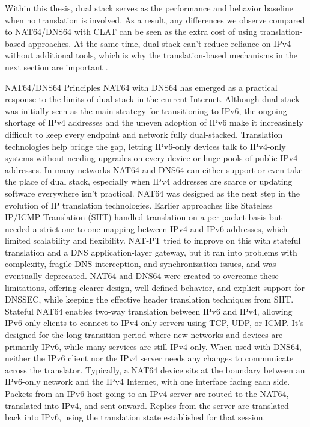 Within this thesis, dual stack serves as the performance and behavior baseline when no translation is involved. As a result, any differences we observe compared to NAT64/DNS64 with CLAT can be seen as the extra cost of using translation-based approaches. At the same time, dual stack can’t reduce reliance on IPv4 without additional tools, which is why the translation-based mechanisms in the next section are important \cite{punithavathani2009ipv4,LEVIN20141059}.

NAT64/DNS64 Principles
NAT64 with DNS64 has emerged as a practical response to the limits of dual stack in the current Internet\cite{rfc7269}. Although dual stack was initially seen as the main strategy for transitioning to IPv6, the ongoing shortage of IPv4 addresses and the uneven adoption of IPv6 make it increasingly difficult to keep every endpoint and network fully dual-stacked\cite{rfc7269}. Translation technologies help bridge the gap, letting IPv6-only devices talk to IPv4-only systems without needing upgrades on every device or huge pools of public IPv4 addresses. In many networks NAT64 and DNS64 can either support or even take the place of dual stack, especially when IPv4 addresses are scarce or updating software everywhere isn’t practical\cite{6231295}.
NAT64 was designed as the next step in the evolution of IP translation technologies. Earlier approaches like Stateless IP/ICMP Translation (SIIT) handled translation on a per-packet basis but needed a strict one-to-one mapping between IPv4 and IPv6 addresses, which limited scalability and flexibility\cite{rfc6146}. NAT-PT tried to improve on this with stateful translation and a DNS application-layer gateway, but it ran into problems with complexity, fragile DNS interception, and synchronization issues, and was eventually deprecated\cite{rfc4966}. NAT64 and DNS64 were created to overcome these limitations, offering clearer design, well-defined behavior, and explicit support for DNSSEC, while keeping the effective header translation techniques from SIIT\cite{6231295}.
Stateful NAT64 enables two-way translation between IPv6 and IPv4, allowing IPv6-only clients to connect to IPv4-only servers using TCP, UDP, or ICMP. It's designed for the long transition period where new networks and devices are primarily IPv6, while many services are still IPv4-only. When used with DNS64, neither the IPv6 client nor the IPv4 server needs any changes to communicate across the translator. Typically, a NAT64 device sits at the boundary between an IPv6-only network and the IPv4 Internet, with one interface facing each side. Packets from an IPv6 host going to an IPv4 server are routed to the NAT64, translated into IPv4, and sent onward. Replies from the server are translated back into IPv6, using the translation state established for that session\cite{rfc6146}.
